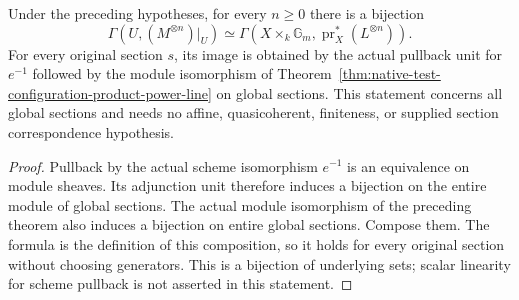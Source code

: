 \begin{theorem}\label{thm:native-test-configuration-whole-open-sections}
\leanok
Under the preceding hypotheses, for every $n\geq0$ there is a bijection
\[
\Gamma(U,(M^{\otimes n})|_U)
 \simeq \Gamma(X\times_k\mathbb G_m,
                  \operatorname{pr}_X^*(L^{\otimes n})).
\]
For every original section $s$, its image is obtained by the actual
pullback unit for $e^{-1}$ followed by the module isomorphism of
Theorem~\ref{thm:native-test-configuration-product-power-line} on global
sections. This statement concerns all global sections and needs no affine,
quasicoherent, finiteness, or supplied section correspondence hypothesis.
\end{theorem}
\begin{proof}
Pullback by the actual scheme isomorphism $e^{-1}$ is an equivalence on
module sheaves. Its adjunction unit therefore induces a bijection on the
entire module of global sections. The actual module isomorphism of the
preceding theorem also induces a bijection on entire global sections.
Compose them. The formula is the definition of this composition, so it
holds for every original section without choosing generators. This is a
bijection of underlying sets; scalar linearity for scheme pullback is not
asserted in this statement.
\end{proof}

